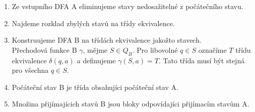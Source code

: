 \documentclass[../main.tex]{subfiles}
\begin{document}
\begin{theorem}
    $ $\\
    \begin{enumerate}
        \item Ze vstupního DFA A eliminujeme stavy nedosažitelné z počátečního stavu.
        \item Najdeme rozklad zbylých stavů na třídy ekvivalence.
        \item Konstruujeme DFA B na třídách ekvivalence jakožto stavech.\\
        Přechodová funkce B $\gamma$, mějme $S\in Q_B$. Pro libovolné $q\in S$ označíme $T$ třídu ekvivalence
        $\delta(q,a)$ a definujeme $\gamma(S,a) = T.$ Tato třída musí být stejná pro všechna $q\in S$.
        \item Počáteční stav B je třída obsahujíci počáteční stav A.
        \item Množina přijímajícich stavů B jsou bloky odpovídajíci přijímacím stavům A.
    \end{enumerate}
\end{theorem}
\end{document}
